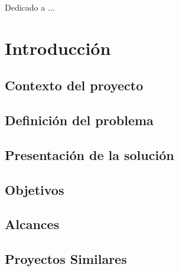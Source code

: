\documentclass{iccmemoria}
\author{Yorch Sepúlveda}
\date{Enero, 2019}
\begin{document}
\maketitle

\begin{dedicatory}
Dedicado a ...
\end{dedicatory}



\tableofcontents
\listoffigures
\listoftables




\chapter{Introducción}
	

	\section{Contexto del proyecto}
	

	\section{Definición del problema}
	

	\section{Presentación de la solución}
	

	\section{Objetivos}
	

	\section{Alcances}
	

	\section{Proyectos Similares}
	
\end{document}
